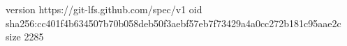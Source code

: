 version https://git-lfs.github.com/spec/v1
oid sha256:cc401f4b634507b70b058deb50f3aebf57eb7f73429a4a0cc272b181c95aae2c
size 2285
